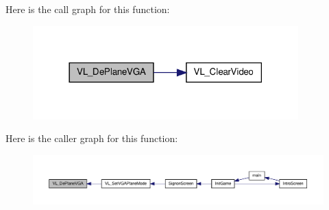 Here is the call graph for this function:
\nopagebreak
\begin{figure}[H]
\begin{center}
\leavevmode
\includegraphics[width=290pt]{ID__VL_8H_a324bc865f0f44dda58c10ada4eae8bb5_cgraph}
\end{center}
\end{figure}




Here is the caller graph for this function:
\nopagebreak
\begin{figure}[H]
\begin{center}
\leavevmode
\includegraphics[width=400pt]{ID__VL_8H_a324bc865f0f44dda58c10ada4eae8bb5_icgraph}
\end{center}
\end{figure}


